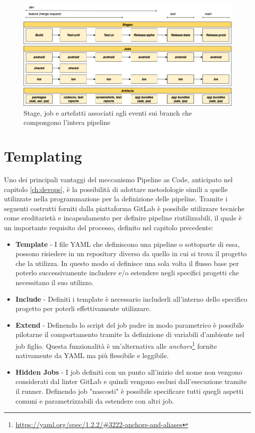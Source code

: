 \begin{figure}[H]
    \centering
    \includegraphics[width=1\textwidth]{img/cicd-branch-jobs.png}
    \caption{Stage, job e artefatti associati agli eventi sui branch che compongono l'intera pipeline}
    \label{pipeline-branches}
\end{figure}

\section{Templating}
Uno dei principali vantaggi del meccanismo Pipeline as Code, 
anticipato nel capitolo \ref{ch:devops}, 
è la possibilità di adottare metodologie simili a quelle utilizzate nella programmazione per la definizione delle pipeline. 
Tramite i seguenti costrutti forniti dalla piattaforma GitLab è possibile utilizzare tecniche come ereditarietà e incapsulamento per definire pipeline riutilizzabili, 
il quale è un importante requisito del processo, 
definito nel capitolo precedente:

\begin{itemize}
    \item \textbf{Template} - I file YAML che definiscono una pipeline o sottoparte di essa, possono risiedere in un repository diverso da quello in cui si trova il progetto che la utilizza. In questo modo si definisce una sola volta il flusso base per poterlo successivamente includere e/o estendere negli specifici progetti che necessitano il suo utilizzo.
    
    \item \textbf{Include} - Definiti i template è necessario includerli all'interno dello specifico progetto per poterli effettivamente utilizzare.
    
    \item \textbf{Extend} - Definendo lo script del job padre in modo parametrico è possibile pilotarne il comportamento tramite la definizione di variabili d'ambiente nel job figlio. Questa funzionalità è un'alternativa alle \textit{anchors}\footnote{\href{https://yaml.org/spec/1.2.2/\#3222-anchors-and-aliases}{https://yaml.org/spec/1.2.2/\#3222-anchors-and-aliases}} fornite nativamente da YAML ma più flessibile e leggibile.
    
    \item \textbf{Hidden Jobs} - I job definiti con un punto all'inizio del nome non vengono considerati dal linter GitLab e quindi vengono esclusi dall'esecuzione tramite il runner. Definendo job "nascosti" è possibile specificare tutti quegli aspetti comuni e parametrizzabili da estendere con altri job.
\end{itemize}

